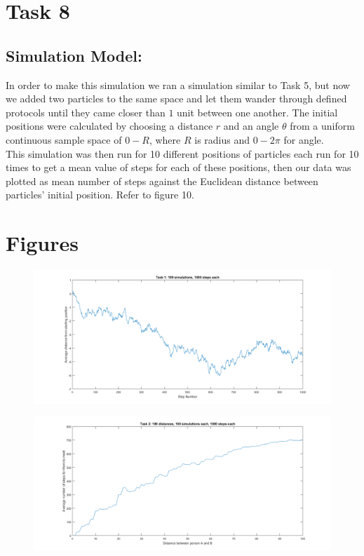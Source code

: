 \documentclass[10pt, a4paper]{article}
\begin{document}
\section*{Task 8}
\subsection*{Simulation Model:}
In order to make this simulation we ran a simulation similar to Task 5, but now we added two particles to the same space and let them wander through defined protocols until they came closer than $1$ unit between one another. The initial positions were calculated by choosing a distance $r$ and an angle $\theta$ from a uniform continuous sample space of $0-R$, where $R$ is radius and $0-2\pi$ for angle.\\
This simulation was then run for 10 different positions of particles each run for 10 times to get a mean value of steps for each of these positions, then our data was plotted as mean number of steps against the Euclidean distance between particles' initial position.
Refer to figure 10.

\newpage

\section*{Figures}

\begin{figure}[H]
    \includegraphics[width=\textwidth]{Task 1 Testing/100 simulations, 1000 steps/graph.png}
    \caption{}
    \label{fig:1}    
  \end{figure}

\begin{figure}[H]
    \includegraphics[width=\textwidth]{Task 2 Testing/ureka.png}
    \caption{}
    \label{fig:2}
\end{figure}
\end{document}
